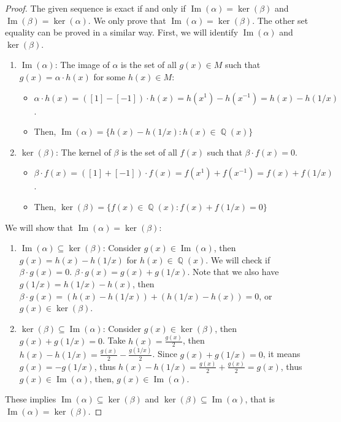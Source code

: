 \documentclass[12t,a4paper]{amsart}
\theoremstyle{definition}
\DeclareMathOperator{\Q}{\mathbb{Q}}
\numberwithin{equation}{section}
\begin{document}
{\begin{proof}
        The given sequence is exact if and only if $\operatorname{Im}(\alpha) = \ker(\beta)$ and $\operatorname{Im}(\beta) = \ker(\alpha)$. We only  prove that $\operatorname{Im}(\alpha) = \ker(\beta)$. The other set equality can be proved in a similar way.  First, we will identify $\operatorname{Im}(\alpha)$ and $\ker(\beta)$.
        \begin{enumerate}
            \item $\operatorname{Im}(\alpha)$: The image of $\alpha$ is the set of all $g(x) \in M$ such that $g(x) = \alpha \cdot h(x)$ for some $h(x) \in M$:
                  \begin{itemize}
                      \item $\alpha \cdot h(x) = ([1] - [-1])\cdot h(x) = h(x^1) - h(x^{-1}) = h(x) - h(1/x)$.
                      \item Then, $\operatorname{Im}(\alpha) = \{h(x) - h(1/x): h(x) \in \Q(x)\}$
                  \end{itemize}
            \item $\ker(\beta)$: The kernel of $\beta$ is the set of all $f(x)$ such that $\beta \cdot f(x) = 0$.
                  \begin{itemize}
                      \item $\beta \cdot f(x) = ([1] + [-1])\cdot f(x) = f(x^1) + f(x^{-1}) = f(x) + f(1/x)$.
                      \item Then, $\ker(\beta) = \{f(x) \in \Q(x): f(x) + f(1/x) = 0\}$
                  \end{itemize}
        \end{enumerate}
        We will show that $\operatorname{Im}(\alpha) = \ker(\beta)$:
        \begin{enumerate}
            \item $\operatorname{Im}(\alpha) \subseteq \ker(\beta)$: Consider $g(x) \in \operatorname{Im}(\alpha)$, then $g(x) = h(x) - h(1/x)$ for $h(x) \in \Q(x)$. We will check if $\beta \cdot g(x) = 0$. $\beta \cdot g(x) = g(x) + g(1/x)$. Note that we also have $g(1/x) = h(1/x) - h(x)$, then $\beta \cdot g(x) = (h(x) - h(1/x)) + (h(1/x) - h(x)) = 0$, or $g(x) \in \ker(\beta)$.
            \item $\ker(\beta) \subseteq \operatorname{Im}(\alpha)$: Consider $g(x) \in \ker(\beta)$, then $g(x) + g(1/x) = 0$. Take $h(x) = \frac{g(x)}{2}$, then $h(x) - h(1/x) = \frac{g(x)}{2} - \frac{g(1/x)}{2}$. Since $g(x) + g(1/x) = 0$, it means $g(x) = -g(1/x)$, thus $h(x) - h(1/x) = \frac{g(x)}{2} + \frac{g(x)}{2} = g(x)$, thus $g(x) \in \operatorname{Im}(\alpha)$, then, $g(x) \in \operatorname{Im}(\alpha)$.
        \end{enumerate}
        These implies $\operatorname{Im}(\alpha) \subseteq \ker(\beta)$ and $\ker(\beta) \subseteq \operatorname{Im}(\alpha)$, that is $\operatorname{Im}(\alpha) = \ker(\beta)$. %
    \end{proof}

}
\end{document}
